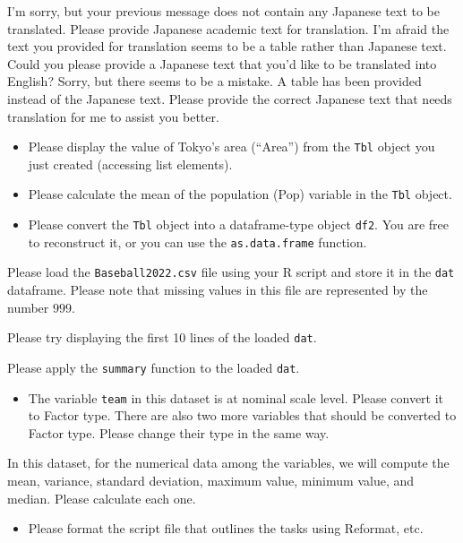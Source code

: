 \documentclass[
  a4paper,
]{book}
\providecommand{\tightlist}{%
  \setlength{\itemsep}{0pt}\setlength{\parskip}{0pt}}\usepackage{longtable,booktabs,array}
\begin{document}
I'm sorry, but your previous message does not contain any Japanese text
to be translated. Please provide Japanese academic text for translation.
I'm afraid the text you provided for translation seems to be a table
rather than Japanese text. Could you please provide a Japanese text that
you'd like to be translated into English? Sorry, but there seems to be a
mistake. A table has been provided instead of the Japanese text. Please
provide the correct Japanese text that needs translation for me to
assist you better.

\begin{itemize}
\item
  Please display the value of Tokyo's area (``Area'') from the
  \texttt{Tbl} object you just created (accessing list elements).
\item
  Please calculate the mean of the population (Pop) variable in the
  \texttt{Tbl} object.
\item
  Please convert the \texttt{Tbl} object into a dataframe-type object
  \texttt{df2}. You are free to reconstruct it, or you can use the
  \texttt{as.data.frame} function.
\end{itemize}

Please load the \texttt{Baseball2022.csv} file using your R script and
store it in the \texttt{dat} dataframe. Please note that missing values
in this file are represented by the number \(999\).

Please try displaying the first 10 lines of the loaded \texttt{dat}.

Please apply the \texttt{summary} function to the loaded \texttt{dat}.

\begin{itemize}
\tightlist
\item
  The variable \texttt{team} in this dataset is at nominal scale level.
  Please convert it to Factor type. There are also two more variables
  that should be converted to Factor type. Please change their type in
  the same way.
\end{itemize}

In this dataset, for the numerical data among the variables, we will
compute the mean, variance, standard deviation, maximum value, minimum
value, and median. Please calculate each one.

\begin{itemize}
\tightlist
\item
  Please format the script file that outlines the tasks using Reformat,
  etc.
\end{itemize}
\end{document}

